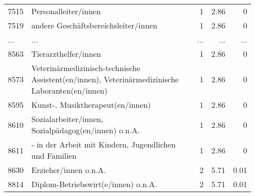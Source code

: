 \begin{longtable}{lXrrr}
        7515 & \multicolumn{1}{X}{Personalleiter/innen} & %
          \num{1} &
          \num[round-mode=places,round-precision=2]{2,86} &
          \num[round-mode=places,round-precision=2]{0} \\
        7519 & \multicolumn{1}{X}{andere Geschäftsbereichsleiter/innen} & %
          \num{1} &
          \num[round-mode=places,round-precision=2]{2,86} &
          \num[round-mode=places,round-precision=2]{0} \\
       ... & ... & ... & ... & ... \\
        8563 & \multicolumn{1}{X}{Tierarzthelfer/innen} & %
          \num{1} &
          \num[round-mode=places,round-precision=2]{2,86} &
          \num[round-mode=places,round-precision=2]{0} \\

        8573 & \multicolumn{1}{X}{Veterinärmedizinisch-technische Assistent(en/innen), Veterinärmedizinische Laboranten(en/innen)} & %
          \num{1} &
          \num[round-mode=places,round-precision=2]{2,86} &
          \num[round-mode=places,round-precision=2]{0} \\

        8595 & \multicolumn{1}{X}{Kunst-, Musiktherapeut(en/innen)} & %
          \num{1} &
          \num[round-mode=places,round-precision=2]{2,86} &
          \num[round-mode=places,round-precision=2]{0} \\

        8610 & \multicolumn{1}{X}{Sozialarbeiter/innen, Sozialpädagog(en/innen) o.n.A.} & %
          \num{1} &
          \num[round-mode=places,round-precision=2]{2,86} &
          \num[round-mode=places,round-precision=2]{0} \\

        8611 & \multicolumn{1}{X}{- in der Arbeit mit Kindern, Jugendlichen und Familien} & %
          \num{1} &
          \num[round-mode=places,round-precision=2]{2,86} &
          \num[round-mode=places,round-precision=2]{0} \\

        8630 & \multicolumn{1}{X}{Erzieher/innen o.n.A.} & %
          \num{2} &
          \num[round-mode=places,round-precision=2]{5,71} &
          \num[round-mode=places,round-precision=2]{0,01} \\

        8814 & \multicolumn{1}{X}{Diplom-Betriebswirt(e/innen) o.n.A.} & %
          \num{2} &
          \num[round-mode=places,round-precision=2]{5,71} &
          \num[round-mode=places,round-precision=2]{0,01} \\


\end{longtable}
